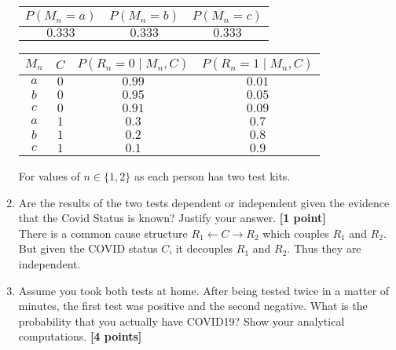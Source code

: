 \begin{enumerate}
        \begin{center}
          \begin{center}
            \bgroup
            \def\arraystretch{1.5}%
            \begin{tabular}{|c|c|c|}
              \hline
              $P(M_n=a)$ & $P(M_n=b)$ & $P(M_n=c)$ \\
              \hline
              $0.333$    & $0.333$    & $0.333$    \\
              \hline
            \end{tabular}
            \egroup
          \end{center}
          \bgroup
          \def\arraystretch{1.5}%
          \begin{tabular}{|cc|c|c|}
            \hline
            $M_n$ & $C$ & $P(R_n=0\mid M_n, C)$ & $P(R_n=1\mid M_n, C)$ \\
            \hline
            $a$   & $0$ & $0.99$                & $0.01$                \\
            \hline
            $b$   & $0$ & $0.95$                & $0.05$                \\
            \hline
            $c$   & $0$ & $0.91$                & $0.09$                \\
            \hline
            $a$   & $1$ & $0.3$                 & $0.7$                 \\
            \hline
            $b$   & $1$ & $0.2$                 & $0.8$                 \\
            \hline
            $c$   & $1$ & $0.1$                 & $0.9$                 \\
            \hline
          \end{tabular}
          \egroup
        \end{center}
        For values of $n \in \{1, 2\}$ as each person has two test kits.
  \item Are the results of the two tests dependent or independent given the evidence that the Covid Status is known? Justify your answer. {\bf [1 point]}\\[5pt]
        There is a common cause structure $R_1 \leftarrow C \rightarrow R_2$ which couples $R_1$ and $R_2$. But given the COVID status $C$, it decouples $R_1$ and $R_2$. Thus they are independent.
  \item Assume you took both tests at home. After being tested twice in a matter of minutes, the first test was positive and the second negative. What is the probability that you actually have COVID19? Show your analytical computations. {\bf [4 points]}\\[5pt]

\end{enumerate}
